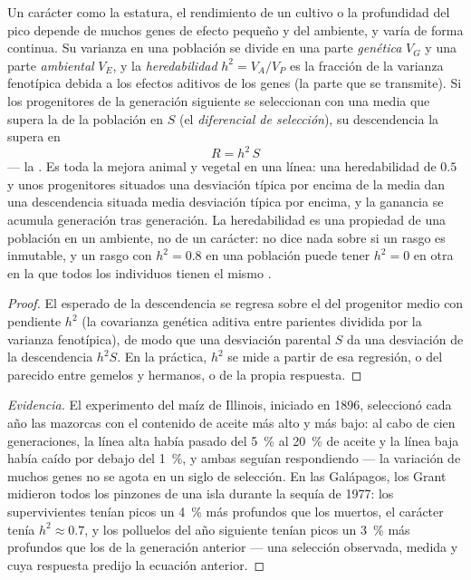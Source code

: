 \begin{theorem}\label{thm:b2:population-genetics:heritability}
Un carácter como la estatura, el rendimiento de un cultivo o la
profundidad del pico depende de muchos genes de efecto pequeño y del
ambiente, y varía de forma continua. Su varianza en una población se
divide en una parte \emph{genética} $V_G$ y una parte \emph{ambiental}
$V_E$, y la \emph{heredabilidad} $h^{2} = V_A/V_P$ es la fracción de la
varianza fenotípica debida a los efectos aditivos de los genes (la parte
que se transmite). Si los progenitores de la generación siguiente se
seleccionan con una media que supera la de la población en $S$ (el
\emph{diferencial de selección}), su descendencia la supera en
\[
R = h^{2}\,S
\]
--- la \emph{}. Es toda la mejora animal y vegetal en
una línea: una heredabilidad de $0.5$ y unos progenitores situados una
desviación típica por encima de la media dan una descendencia situada
media desviación típica por encima, y la ganancia se acumula generación
tras generación. La heredabilidad es una propiedad de una población en un
ambiente, no de un carácter: no dice nada sobre si un rasgo es inmutable,
y un rasgo con $h^{2} = 0.8$ en una población puede tener
$h^{2} = 0$ en otra en la que todos los individuos tienen el mismo
.
\end{theorem}
\begin{proof}
El  esperado de la descendencia se regresa sobre el del
progenitor medio con pendiente $h^{2}$ (la covarianza genética aditiva
entre parientes dividida por la varianza fenotípica), de modo que una
desviación parental $S$ da una desviación de la descendencia $h^{2}S$. En
la práctica, $h^{2}$ se mide a partir de esa regresión, o del parecido
entre gemelos y hermanos, o de la propia respuesta.
\end{proof}
\begin{proof}[Evidencia]
El experimento del maíz de Illinois, iniciado en 1896, seleccionó cada año
las mazorcas con el contenido de aceite más alto y más bajo: al cabo de
cien generaciones, la línea alta había pasado del \qty{5}{\%} al
\qty{20}{\%} de aceite y la línea baja había caído por debajo del
\qty{1}{\%}, y ambas seguían respondiendo --- la variación de muchos genes
no se agota en un siglo de selección. En las Galápagos, los Grant midieron
todos los pinzones de una isla durante la sequía de 1977: los
supervivientes tenían picos un \qty{4}{\%} más profundos que los muertos,
el carácter tenía $h^{2}
\approx 0.7$, y los polluelos del año siguiente tenían picos un
\qty{3}{\%} más profundos que los de la generación anterior --- una
selección observada, medida y cuya respuesta predijo la ecuación
anterior.
\end{proof}

